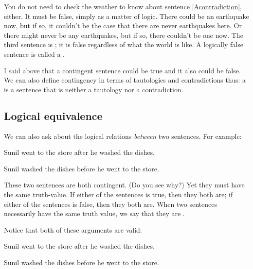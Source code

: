 You do not need to check the weather to know about sentence \ref{Acontradiction}, either. It must be false, simply as a matter of logic. There could be an earthquake now, but if so, it couldn't be the case that there are never earthquakes here. Or there might never be any earthquakes, but if so, there couldn't be one now. The third sentence is ; it is false regardless of what the world is like. A logically false sentence is called a .

I said above that a contingent sentence could be true and it also could be false. We can also define contingency in terms of tautologies and contradictions thus: a  is a sentence that is neither a tautology nor a contradiction.


\subsection{Logical equivalence}
We can also ask about the logical relations \emph{between} two sentences. For example:
\begin{earg}
\item[] Sunil went to the store after he washed the dishes.
\item[] Sunil washed the dishes before he went to the store.
\end{earg}
These two sentences are both contingent. (Do you see why?) Yet they must have the same truth-value. If either of the sentences is true, then they both are; if either of the sentences is false, then they both are. When two sentences necessarily have the same truth value, we say that they are .

Notice that both of these arguments are valid:

\begin{earg}
\item[] Sunil went to the store after he washed the dishes.
\item[\therefore] Sunil washed the dishes before he went to the store.
\end{earg}


